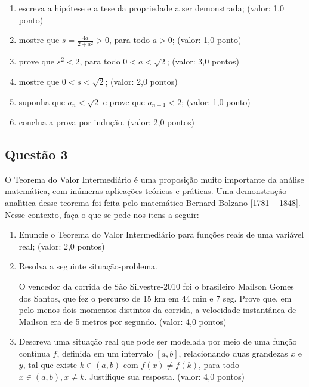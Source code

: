 \begin{enumerate}

\item[(a)] escreva a hip\'otese e a tese da propriedade a ser demonstrada; (valor: 1,0 ponto)

\item[(b)] mostre que $\displaystyle{s = \frac{4a}{2+a^2}>0}$, para todo $a>0$; (valor: 1,0 ponto)

\item[(c)] prove que $s^2<2$, para todo $0<a<\sqrt{2}$; (valor: 3,0 pontos)

\item[(d)] mostre que $0<s<\sqrt{2}$; (valor: 2,0 pontos)

\item[(e)] suponha que $a_n<\sqrt{2}$ e prove que $a_{n+1}<2$; (valor: 1,0 ponto)

\item[(f)] conclua a prova por indu\c c\~ao. (valor: 2,0 pontos)

\end{enumerate}

\subsection{\color{blue} Quest\~ao 3}

O Teorema do Valor Intermedi\'ario \'e uma proposi\c c\~ao muito importante da an\'alise matem\'atica, com in\'umeras aplica\c c\~oes te\'oricas e pr\'aticas. Uma demonstra\c c\~ao anal\'\i tica desse teorema foi feita pelo matem\'atico Bernard Bolzano [1781 – 1848]. Nesse contexto, fa\c ca o que se pede nos itens a seguir:

\begin{enumerate}

\item[(a)] Enuncie o Teorema do Valor Intermedi\'ario para fun\c c\~oes reais de uma vari\'avel real; (valor: 2,0 pontos)

\item[(b)] Resolva a seguinte situa\c c\~ao-problema.

O vencedor da corrida de S\~ao Silvestre-2010 foi o brasileiro Mailson Gomes dos Santos, que fez o percurso de 15 km em 44 min e 7 seg. Prove que, em pelo menos dois momentos distintos da corrida, a velocidade instant\^anea de Mailson era de 5 metros por segundo. (valor: 4,0 pontos)

\item[(c)] Descreva uma situa\c c\~ao real que pode ser modelada por meio de uma fun\c c\~ao cont\'\i nua $f$, definida em um intervalo $[a , b]$, relacionando duas grandezas $x$ e $y$, tal que existe $k\in (a , b)$ com $f(x) \neq f(k)$, para todo $x\in (a , b), x \neq k$. Justifique sua resposta. (valor: 4,0 pontos)

\end{enumerate}

